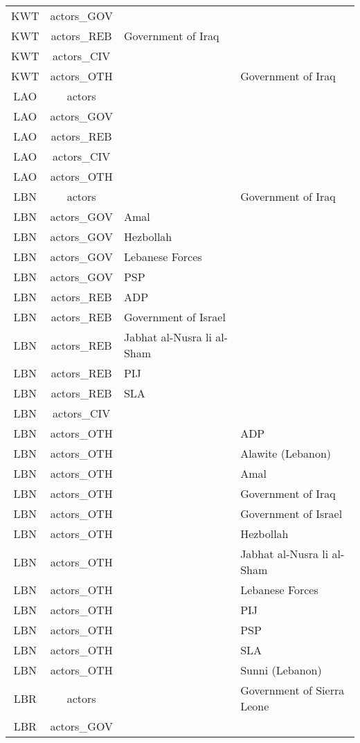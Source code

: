 \documentclass[12pt]{article}
\begin{document}
\begin{center}
\begin{longtable}{|c|c|p{7cm}|p{7cm}|}
  KWT & actors\_GOV &  &  \\ 
  KWT & actors\_REB & Government of Iraq &  \\ 
  KWT & actors\_CIV &  &  \\ 
  KWT & actors\_OTH &  & Government of Iraq \\ 
  LAO & actors &  &  \\ 
  LAO & actors\_GOV &  &  \\ 
  LAO & actors\_REB &  &  \\ 
  LAO & actors\_CIV &  &  \\ 
  LAO & actors\_OTH &  &  \\ 
  LBN & actors &  & Government of Iraq \\ 
  LBN & actors\_GOV & Amal &  \\ 
  LBN & actors\_GOV & Hezbollah &  \\ 
  LBN & actors\_GOV & Lebanese Forces &  \\ 
  LBN & actors\_GOV & PSP &  \\ 
  LBN & actors\_REB & ADP &  \\ 
  LBN & actors\_REB & Government of Israel &  \\ 
  LBN & actors\_REB & Jabhat al-Nusra li al-Sham &  \\ 
  LBN & actors\_REB & PIJ &  \\ 
  LBN & actors\_REB & SLA &  \\ 
  LBN & actors\_CIV &  &  \\ 
  LBN & actors\_OTH &  & ADP \\ 
  LBN & actors\_OTH &  & Alawite (Lebanon) \\ 
  LBN & actors\_OTH &  & Amal \\ 
  LBN & actors\_OTH &  & Government of Iraq \\ 
  LBN & actors\_OTH &  & Government of Israel \\ 
  LBN & actors\_OTH &  & Hezbollah \\ 
  LBN & actors\_OTH &  & Jabhat al-Nusra li al-Sham \\ 
  LBN & actors\_OTH &  & Lebanese Forces \\ 
  LBN & actors\_OTH &  & PIJ \\ 
  LBN & actors\_OTH &  & PSP \\ 
  LBN & actors\_OTH &  & SLA \\ 
  LBN & actors\_OTH &  & Sunni (Lebanon) \\ 
  LBR & actors &  & Government of Sierra Leone \\ 
  LBR & actors\_GOV &  &  \\ 

\end{longtable}
\end{center}
\end{document}
